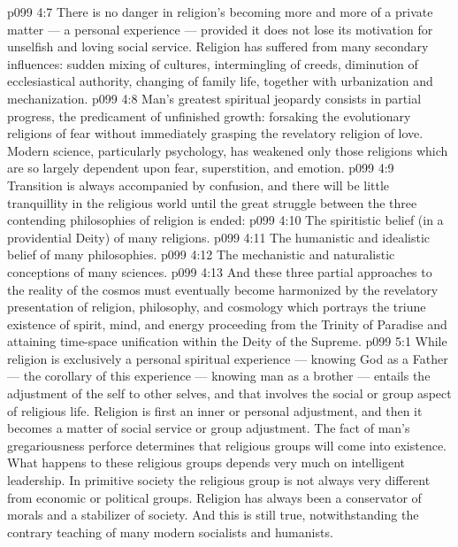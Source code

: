 \vs p099 4:7 \pc There is no danger in religion’s becoming more and more of a private matter --- a personal experience --- provided it does not lose its motivation for unselfish and loving social service. Religion has suffered from many secondary influences: sudden mixing of cultures, intermingling of creeds, diminution of ecclesiastical authority, changing of family life, together with urbanization and mechanization.
\vs p099 4:8 Man’s greatest spiritual jeopardy consists in partial progress, the predicament of unfinished growth: forsaking the evolutionary religions of fear without immediately grasping the revelatory religion of love. Modern science, particularly psychology, has weakened only those religions which are so largely dependent upon fear, superstition, and emotion.
\vs p099 4:9 Transition is always accompanied by confusion, and there will be little tranquillity in the religious world until the great struggle between the three contending philosophies of religion is ended:
\vs p099 4:10 \bibnobreakspace The spiritistic belief (in a providential Deity) of many religions.
\vs p099 4:11 \bibnobreakspace The humanistic and idealistic belief of many philosophies.
\vs p099 4:12 \bibnobreakspace The mechanistic and naturalistic conceptions of many sciences.
\vs p099 4:13 \pc And these three partial approaches to the reality of the cosmos must eventually become harmonized by the revelatory presentation of religion, philosophy, and cosmology which portrays the triune existence of spirit, mind, and energy proceeding from the Trinity of Paradise and attaining time\hyp{}space unification within the Deity of the Supreme.
\vs p099 5:1 While religion is exclusively a personal spiritual experience --- knowing God as a Father --- the corollary of this experience --- knowing man as a brother --- entails the adjustment of the self to other selves, and that involves the social or group aspect of religious life. Religion is first an inner or personal adjustment, and then it becomes a matter of social service or group adjustment. The fact of man’s gregariousness perforce determines that religious groups will come into existence. What happens to these religious groups depends very much on intelligent leadership. In primitive society the religious group is not always very different from economic or political groups. Religion has always been a conservator of morals and a stabilizer of society. And this is still true, notwithstanding the contrary teaching of many modern socialists and humanists.
